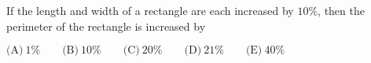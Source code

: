 

If the length and width of a rectangle are each increased by $10\%$, then the perimeter of the rectangle is increased by

$\text{(A)}\ 1\% \qquad \text{(B)}\ 10\% \qquad \text{(C)}\ 20\% \qquad \text{(D)}\ 21\% \qquad \text{(E)}\ 40\%$
